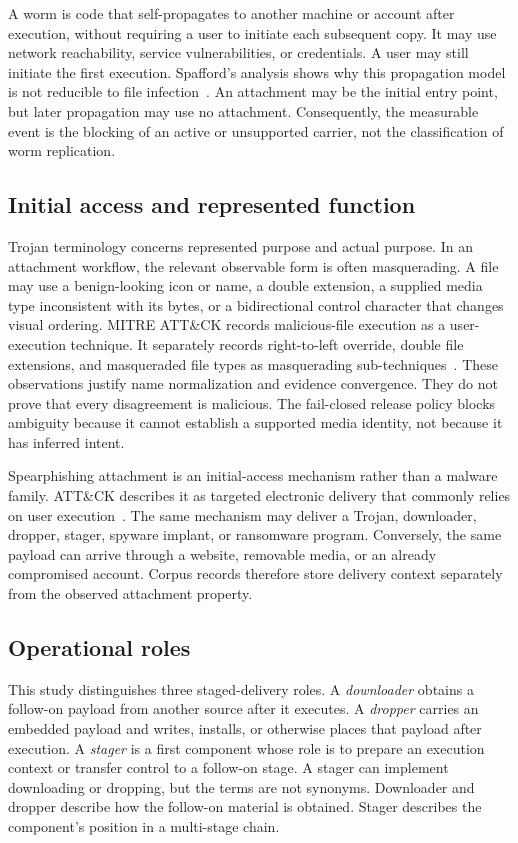 A worm is code that self-propagates to another machine or account after
execution, without requiring a user to initiate each subsequent copy. It may
use network reachability, service vulnerabilities, or credentials. A user may
still initiate the first execution. Spafford's analysis shows why this
propagation model is not reducible to file infection~\cite{spafford1989}. An
attachment may be the initial entry point, but later propagation may use no
attachment. Consequently, the measurable event is the blocking of an active or
unsupported carrier, not the classification of worm replication.

\subsection{Initial access and represented function}

Trojan terminology concerns represented purpose and actual purpose. In an
attachment workflow, the relevant observable form is often masquerading. A
file may use a benign-looking icon or name, a double extension, a supplied
media type inconsistent with its bytes, or a bidirectional control character
that changes visual ordering. MITRE ATT\&CK records malicious-file execution as
a user-execution technique. It separately records right-to-left override,
double file extensions, and masqueraded file types as masquerading
sub-techniques~\cite{mitreT1204002,mitreT1036002,mitreT1036007,
mitreT1036008}. These observations justify name normalization and evidence
convergence. They do not prove that every disagreement is malicious. The
fail-closed release policy blocks ambiguity because it cannot establish a
supported media identity, not because it has inferred intent.

Spearphishing attachment is an initial-access mechanism rather than a malware
family. ATT\&CK describes it as targeted electronic delivery that commonly
relies on user execution~\cite{mitreT1566001}. The same mechanism may deliver a
Trojan, downloader, dropper, stager, spyware implant, or ransomware program.
Conversely, the same payload can arrive through a website, removable media, or
an already compromised account. Corpus records therefore store delivery context
separately from the observed attachment property.

\subsection{Operational roles}

This study distinguishes three staged-delivery roles. A \emph{downloader}
obtains a follow-on payload from another source after it executes. A
\emph{dropper} carries an embedded payload and writes, installs, or otherwise
places that payload after execution. A \emph{stager} is a first component whose
role is to prepare an execution context or transfer control to a follow-on
stage. A stager can implement downloading or dropping, but the terms are not
synonyms. Downloader and dropper describe how the follow-on material is
obtained. Stager describes the component's position in a multi-stage chain.

